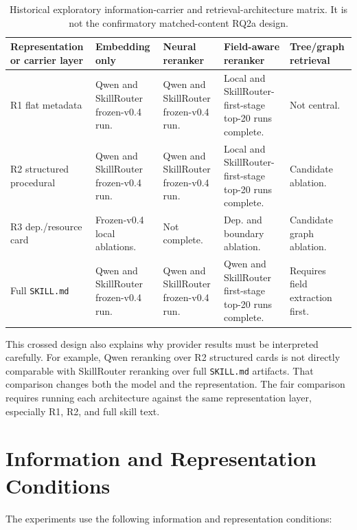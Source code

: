 \begin{table}[h]
\centering
\scriptsize
\setlength{\tabcolsep}{2pt}
\begin{tabular}{p{}p{}p{}p{}p{}}
\toprule
Representation or carrier layer & Embedding only & Neural reranker & Field-aware reranker & Tree/graph retrieval \\
\midrule
R1 flat metadata & Qwen and SkillRouter frozen-v0.4 run. & Qwen and SkillRouter frozen-v0.4 run. & Local and SkillRouter-first-stage top-20 runs complete. & Not central. \\
R2 structured procedural & Qwen and SkillRouter frozen-v0.4 run. & Qwen and SkillRouter frozen-v0.4 run. & Local and SkillRouter-first-stage top-20 runs complete. & Candidate ablation. \\
R3 dep./resource card & Frozen-v0.4 local ablations. & Not complete. & Dep. and boundary ablation. & Candidate graph ablation. \\
Full \texttt{SKILL.md} & Qwen and SkillRouter frozen-v0.4 run. & Qwen and SkillRouter frozen-v0.4 run. & Qwen and SkillRouter first-stage top-20 runs complete. & Requires field extraction first. \\
\bottomrule
\end{tabular}
\caption{Historical exploratory information-carrier and retrieval-architecture matrix. It is not the confirmatory matched-content RQ2a design.}
\label{tab:method-crossed-design}
\end{table}

This crossed design also explains why provider results must be interpreted carefully. For example, Qwen reranking over R2 structured cards is not directly comparable with SkillRouter reranking over full \texttt{SKILL.md} artifacts. That comparison changes both the model and the representation. The fair comparison requires running each architecture against the same representation layer, especially R1, R2, and full skill text.

\section{Information and Representation Conditions}

The experiments use the following information and representation conditions:

